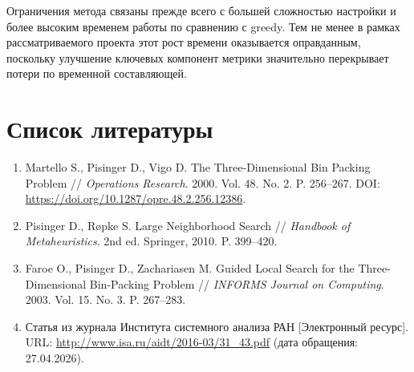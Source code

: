 \documentclass[12pt,a4paper]{article}
\begin{document}
Ограничения метода связаны прежде всего с большей сложностью настройки и более высоким временем работы по сравнению с greedy. Тем не менее в рамках рассматриваемого проекта этот рост времени оказывается оправданным, поскольку улучшение ключевых компонент метрики значительно перекрывает потери по временной составляющей.

\newpage
\section{Список литературы}

\begin{enumerate}
  \item Martello S., Pisinger D., Vigo D. The Three-Dimensional Bin Packing Problem // \textit{Operations Research}. 2000. Vol. 48. No. 2. P. 256--267. DOI: \url{https://doi.org/10.1287/opre.48.2.256.12386}.

  \item Pisinger D., R{\o}pke S. Large Neighborhood Search // \textit{Handbook of Metaheuristics}. 2nd ed. Springer, 2010. P. 399--420.

  \item Faroe O., Pisinger D., Zachariasen M. Guided Local Search for the Three-Dimensional Bin-Packing Problem // \textit{INFORMS Journal on Computing}. 2003. Vol. 15. No. 3. P. 267--283.

  \item Статья из журнала Института системного анализа РАН [Электронный ресурс]. URL: \url{http://www.isa.ru/aidt/2016-03/31_43.pdf} (дата обращения: 27.04.2026).
\end{enumerate}
\end{document}
